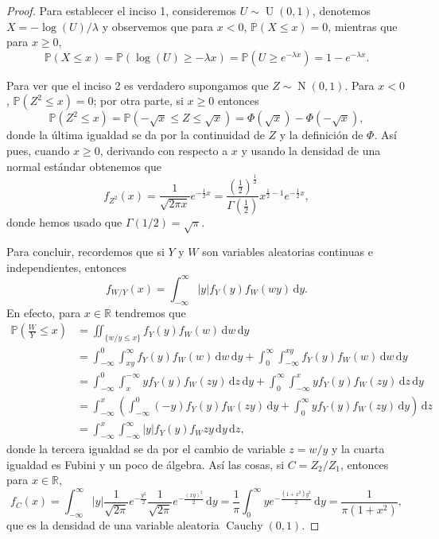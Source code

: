 \documentclass[11pt,article,oneside]{memoir}
\theoremstyle{plain}
\theoremstyle{definition}
\theoremstyle{remark}
\newcommand\RR{\mathbb R}
\newcommand\1{\mathbbm 1}
\newcommand\PP{\mathbb P}
\newcommand\dd{\,\mathrm d}
\DeclareMathOperator\gauss{N}
\DeclareMathOperator\unif{U}
\DeclareMathOperator\cau{Cauchy}
\newcommand\abs[1]{\ensuremath{\left\lvert #1 \right\rvert}}
\begin{document}
\begin{proof}
    Para establecer el inciso 1, consideremos $U \sim \unif(0,1)$, denotemos $X = -\log(U)/\lambda$ y observemos que para $x < 0$, $\PP(X \leq x) = 0$, mientras que para $x \geq 0$, 
    \[
        \PP(X \leq x) = \PP(\log(U) \geq -\lambda x) = \PP(U \geq e^{-\lambda x}) = 1 - e^{-\lambda x}.
    \]

    Para ver que el inciso 2 es verdadero supongamos que $Z \sim \gauss(0,1)$. Para $x < 0$, $\PP(Z^2 \leq x) = 0$; por otra parte, si $x \geq 0$ entonces
    \[
        \PP(Z^2 \leq x) = \PP(-\sqrt x \leq Z \leq \sqrt x) = \Phi(\sqrt x) - \Phi(-\sqrt x),
    \]
    donde la última igualdad se da por la continuidad de $Z$ y la definición de $\Phi$. Así pues, cuando $x \geq 0$, derivando con respecto a $x$ y usando la densidad de una normal estándar obtenemos que 
    \[
        f_{Z^2}(x) = \frac{1}{\sqrt{2\pi x}} e^{-\frac 1 2 x} = \frac{\left(\frac 1 2 \right)^\frac{1}{2}}{\Gamma \left(\frac 1 2\right)} x^{\frac{1}{2} - 1} e^{-\frac 1 2 x},
    \]
    donde hemos usado que $\Gamma(1/2) = \sqrt \pi$.

    Para concluir, recordemos que si $Y$ y $W$ son variables aleatorias continuas e independientes, entonces 
    \[
        f_{W/Y}(x) = \int_{-\infty}^\infty \abs{y} f_Y(y) f_W(wy) \dd y.
    \]
    En efecto, para $x \in \RR$ tendremos que
    \begin{align*}
        \PP\left(\frac W Y \leq x \right) & = \iint_{\{w/y \leq x\}} f_Y(y) f_W(w) \dd w\dd y \\
        & = \int_{-\infty}^0 \int_{xy}^\infty f_Y(y) f_W(w) \dd w\dd y + \int_0^\infty \int_{-\infty}^{xy} f_Y(y) f_W(w) \dd w\dd y \\
        & = \int_{-\infty}^0 \int_x^{-\infty} y f_Y(y) f_W(zy) \dd z\dd y + \int_0^\infty \int_{-\infty}^x y f_Y(y) f_W(zy) \dd z\dd y \\
        & = \int_{-\infty}^x \left( \int_{-\infty}^0 (-y) f_Y(y) f_W(zy) \dd y +  \int_0^\infty y f_Y(y) f_W(zy) \dd y \right) \dd z \\
        & = \int_{-\infty}^x \int_{-\infty}^\infty \abs{y} f_Y(y) f_W{zy} \dd y\dd z,
    \end{align*}
    donde la tercera igualdad se da por el cambio de variable $z = w/y$ y la cuarta igualdad es Fubini y un poco de álgebra. Así las cosas, si $C = Z_2 / Z_1$, entonces para $x \in \RR$, 
    \[
        f_C(x) = \int_{-\infty}^\infty \abs{y} \frac{1}{\sqrt{2\pi}} e^{-\frac{y^2}{2}} \frac{1}{\sqrt{2\pi}} e^{-\frac{(xy)^2}{2}} \dd y = \frac 1 \pi \int_0^\infty y e^{- \frac{(1+x^2)y^2}{2}} \dd y = \frac{1}{\pi(1 + x^2)},
    \]
    que es la densidad de una variable aleatoria $\cau(0,1)$.
\end{proof}



\end{document}

